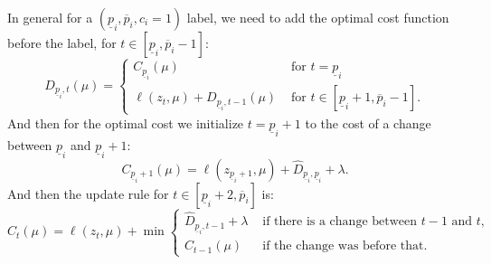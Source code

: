 \documentclass{article}
\begin{document}
In general for a $(\underline p_i,\overline p_i,c_i=1)$ label, we need
to add the optimal cost function before the label, for
$t\in[\underline p_i, \overline p_i-1]$:
\begin{equation}
D_{\underline p_i, t}(\mu) = 
\begin{cases}
  C_{\underline p_i}(\mu) & \text{ for }t=\underline p_i\\
  \ell(z_t, \mu) + D_{\underline p_i,t-1}(\mu) & \text{ for }t\in[\underline p_i+1, \overline p_i-1].
\end{cases}
\end{equation}
And then for the optimal cost we initialize $t=\underline p_i+1$ to
the cost of a change between $\underline p_i$ and $\underline p_i+1$:
\begin{equation}
  C_{\underline p_i+1}(\mu)=\ell(z_{\underline p_i+1},\mu)+\hat D_{\underline p_i,\underline p_i}+\lambda.
\end{equation}
And then
the update rule for
$t\in[\underline p_i+2, \overline p_i]$ is:
\begin{equation}
  \label{eq:positive_update}
  C_t(\mu)=\ell(z_t, \mu) + \min
  \begin{cases}
\hat D_{\underline p_i, t-1}+\lambda &\text{ if there is a change between $t-1$ and $t$,}\\
C_{t-1}(\mu) & \text{ if the change was before that.}
  \end{cases}
\end{equation}
\end{document}
